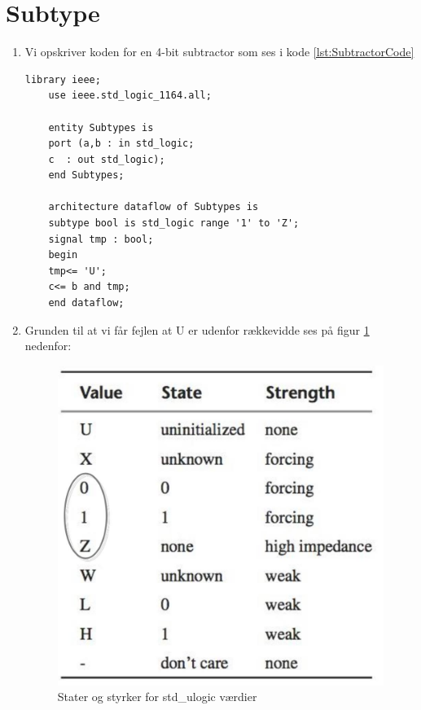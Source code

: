 \section{Subtype}
\begin{enumerate}
	\item[1)]
	Vi opskriver koden for en 4-bit subtractor som ses i kode \ref{lst:SubtractorCode}
	\begin{lstlisting}[caption={Subtractor kode},label={lst:SubtractorCode}]
	library ieee;
	use ieee.std_logic_1164.all;
	
	entity Subtypes is
	port (a,b : in std_logic;
	c  : out std_logic);
	end Subtypes;
	
	architecture dataflow of Subtypes is
	subtype bool is std_logic range '1' to 'Z';
	signal tmp : bool;
	begin 
	tmp<= 'U';
	c<= b and tmp;
	end dataflow;
		\end{lstlisting}
	\item[2)]
	
	Grunden til at vi får fejlen at U er udenfor rækkevidde ses på figur \ref{fig:stdulogicvalues} nedenfor:
	
		\begin{figure}[H]
			\centering
			\includegraphics[scale=0.23]{pictures/Oevelse3/Oevelse4_01Z.jpg}
			\caption{Stater og styrker for std\_ulogic værdier}
			\label{fig:stdulogicvalues}
		\end{figure}
	

\end{enumerate}
